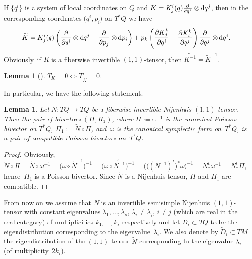 \documentclass[pdftex]{sigma}
\numberwithin{equation}{section}
\newtheorem{Lemma}[Theorem]{Lemma}
\begin{document}
If $\{q^i\}$ is a system of local coordinates on $Q$ and $K=K^i_j (q) \frac{\partial}{\partial q^i } \otimes {\rm d}q^j $, then in the corresponding coordinates $\big(q^i, p_i\big)$ on $T^*Q$ we have
\begin{gather*}
\widetilde{K}= K^i_j (q) \left( \frac{\partial}{\partial q^i } \otimes {\rm d}q^j + \frac{\partial}{\partial p_j } \otimes {\rm d}p_i \right)
+ p_k \left( \frac{\partial K^k_j }{\partial q^i} - \frac{\partial K^k_i }{\partial q^j} \right) \frac{\partial}{\partial q^j}\otimes {\rm d}q^i
.\end{gather*}
Obviously, if $K$ is a fiberwise invertible $(1,1)$-tensor, then $\widetilde{K^{-1}}=\widetilde{K}^{-1}$.

\begin{Lemma}[\cite{t12}]\label{tors} $T_K=0\Longleftrightarrow T_{\widetilde{K}}=0$.
\end{Lemma}

In particular, we have the following statement.

\begin{Lemma}\label{constt}Let $N\colon TQ\to TQ$ be a fiberwise invertible Nijenhuis $(1,1)$-tensor. Then the pair of bivectors $(\Pi,\Pi_1)$, where $\Pi:=\omega^{-1}$ is the canonical Poisson bivector on $T^*Q$, $\Pi_1:=\widetilde{N}\circ\Pi$, and~$\omega $ is the canonical symplectic form on~$T^*Q$, is a pair of compatible Poisson bivectors on~$T^*Q$.
\end{Lemma}

\begin{proof} Obviously, $\widetilde{N}\circ\Pi=\widetilde{N}\circ \omega^{-1}=\big(\omega\circ \widetilde{N}^{-1}\big)^{-1}=\big(\omega\circ \widetilde{N^{-1}}\big)^{-1}=\big(\big((N^{-1})^t\big)^*\omega\big)^{-1}=N^t_*\omega^{-1}=N^t_*\Pi$, hence~$\Pi_1$ is a Poisson bivector. Since $\widetilde{N}$ is a Nijenhuis tensor, $\Pi$ and $\Pi_1$ are compatible.
\end{proof}

From now on we assume that $N$ is an invertible semisimple Nijenhuis $(1,1)$-tensor with constant eigenvalues $\lambda_1,\dots,\lambda_s$, $\lambda_i\not=\lambda_j$, $i\not=j$ (which are real in the real category) of multiplicities $k_1,\dots,k_s$ respectively and let $D_i \subset TQ$ to be the eigendistribution corresponding to the eigenvalue~$\lambda_i$. We also denote by $\widetilde{ D}_i \subset TM$ the eigendistribution of the $(1,1)$-tensor $\widetilde{N}$ corresponding to the eigenvalue $\lambda_i$ (of multiplicity~$2k_i$).
\end{document}
